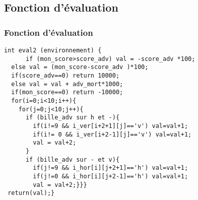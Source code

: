 	\subsection{Fonction d'évaluation}
	\begin{frame}[fragile]
		\frametitle{\textbf{Fonction d'évaluation}}
		\begin{footnotesize}
		\begin{verbatim}
int eval2 (environnement) {
	  if (mon_score>score_adv) val = -score_adv *100; 
  else val = (mon_score-score_adv )*100; 
  if(score_adv==0) return 10000; 
  else val = val + adv_mort*1000; 
  if(mon_score==0) return -10000;
  for(i=0;i<10;i++){
    for(j=0;j<10;j++){
      if (bille_adv sur h et -){
        if(i!=9 && i_ver[i+2+1][j]=='v') val=val+1;
        if(i!= 0 && i_ver[i+2-1][j]=='v') val=val+1;
        val = val+2;
      }
      if (bille_adv sur - et v){
        if(j!=9 && i_hor[i][j+2+1]=='h') val=val+1;
        if(j!=0 && i_hor[i][j+2-1]=='h') val=val+1;
        val = val+2;}}}
 return(val);}
		\end{verbatim}
		\end{footnotesize}
		
	\end{frame}